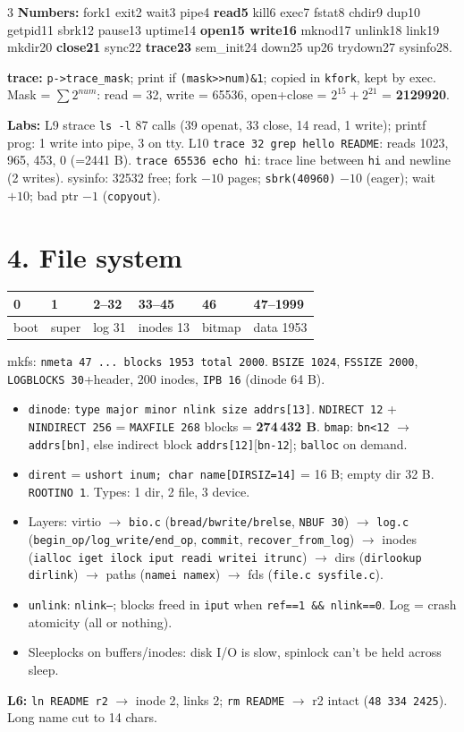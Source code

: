 \documentclass[9pt]{extarticle}
\newcommand{\cc}[1]{\texttt{#1}}
\newcommand{\ra}{$\rightarrow$}
\begin{document}
\begin{multicols*}{3}
\textbf{Numbers:} fork1 exit2 wait3 pipe4 \textbf{read5} kill6 exec7 fstat8 chdir9 dup10 getpid11 sbrk12 pause13 uptime14 \textbf{open15 write16} mknod17 unlink18 link19 mkdir20 \textbf{close21} sync22 \textbf{trace23} sem\_init24 down25 up26 trydown27 sysinfo28.

\textbf{trace:} \cc{p->trace\_mask}; print if \cc{(mask>>num)\&1}; copied in \cc{kfork}, kept by exec. Mask = $\sum 2^{num}$: read = 32, write = 65536, open+close = $2^{15}+2^{21}$ = \textbf{2129920}.

\textbf{Labs:} L9 strace \cc{ls -l} 87 calls (39 openat, 33 close, 14 read, 1 write); printf prog: 1 write into pipe, 3 on tty. L10 \cc{trace 32 grep hello README}: reads 1023, 965, 453, 0 (=2441 B). \cc{trace 65536 echo hi}: trace line between \cc{hi} and newline (2 writes). sysinfo: 32532 free; fork $-10$ pages; \cc{sbrk(40960)} $-10$ (eager); wait $+10$; bad ptr $-1$ (\cc{copyout}).

\section{4. File system}
\begin{tabular}{@{}l|l|l|l|l|l@{}}
0&1&2--32&33--45&46&47--1999\\\hline
boot&super&log 31&inodes 13&bitmap&data 1953
\end{tabular}

mkfs: \cc{nmeta 47 ... blocks 1953 total 2000}. \cc{BSIZE 1024}, \cc{FSSIZE 2000}, \cc{LOGBLOCKS 30}+header, 200 inodes, \cc{IPB 16} (dinode 64 B).
\begin{itemize}
\item \cc{dinode}: \cc{type major minor nlink size addrs[13]}. \cc{NDIRECT 12} + \cc{NINDIRECT 256} = \cc{MAXFILE 268} blocks = \textbf{274\,432 B}. \cc{bmap}: \cc{bn<12} \ra{} \cc{addrs[bn]}, else indirect block \cc{addrs[12]}[\cc{bn-12}]; \cc{balloc} on demand.
\item \cc{dirent} = \cc{ushort inum; char name[DIRSIZ=14]} = 16 B; empty dir 32 B. \cc{ROOTINO 1}. Types: 1 dir, 2 file, 3 device.
\item Layers: virtio \ra{} \cc{bio.c} (\cc{bread/bwrite/brelse}, \cc{NBUF 30}) \ra{} \cc{log.c} (\cc{begin\_op/log\_write/end\_op}, \cc{commit}, \cc{recover\_from\_log}) \ra{} inodes (\cc{ialloc iget ilock iput readi writei itrunc}) \ra{} dirs (\cc{dirlookup dirlink}) \ra{} paths (\cc{namei namex}) \ra{} fds (\cc{file.c sysfile.c}).
\item \cc{unlink}: \cc{nlink--}; blocks freed in \cc{iput} when \cc{ref==1 \&\& nlink==0}. Log = crash atomicity (all or nothing).
\item Sleeplocks on buffers/inodes: disk I/O is slow, spinlock can't be held across sleep.
\end{itemize}
\textbf{L6:} \cc{ln README r2} \ra{} inode 2, links 2; \cc{rm README} \ra{} r2 intact (\cc{48 334 2425}). Long name cut to 14 chars.


\end{multicols*}
\end{document}
